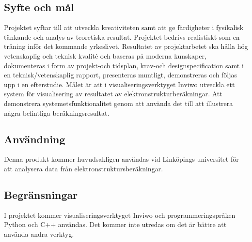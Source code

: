 \subsection{Syfte och mål}
Projektet syftar till att utveckla kreativiteten samt att ge färdigheter i fysikalisk tänkande och analys av teoretiska resultat. Projektet bedrivs realistiskt som en träning inför det kommande yrkeslivet. Resultatet av projektarbetet ska hålla hög vetenskaplig och teknisk kvalité och baseras på moderna kunskaper, dokumenteras i form av projekt-och tidsplan, krav-och designspecification samt i en teknisk/vetenskaplig rapport, presenteras muntligt, demonstreras och följas upp i en efterstudie. Målet är att i visualiseringsverktyget Inviwo utveckla ett system för visualisering av resultatet av elektronstrukturberäkningar. Att demonstrera systemetsfunktionalitet genom att använda det till att illustrera några befintliga beräkningsresultat.

\subsection{Användning}
Denna produkt kommer huvudsakligen användas vid Linköpings universitet för att analysera data från elektronstruktursberäkningar.

\subsection{Begränsningar}
I projektet kommer visualiseringsverktyget Inviwo och programmeringspråken Python och C++ användas. Det kommer inte utredas om det är bättre att använda andra verktyg.

